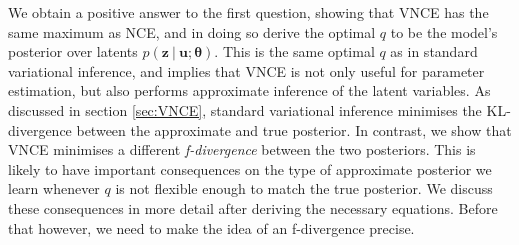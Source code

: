 \documentclass[11pt, oneside]{article}
\newcommand{\thetab}{{\boldsymbol{\theta}}}
\renewcommand{\u}{{\mathbf u}}
\newcommand{\z}{{\mathbf z}}
\newcommand\given[1][]{\:#1\vert\:}
\theoremstyle{definition}
\begin{document}
We obtain a positive answer to the first question, showing that VNCE has the same maximum as NCE, and in doing so derive the optimal $q$ to be the model's posterior over latents $p(\z \given \u ; \thetab)$. This is the same optimal $q$ as in standard variational inference, and implies that VNCE is not only useful for parameter estimation, but also performs approximate inference of the latent variables. As discussed in section \ref{sec:VNCE}, standard variational inference minimises the KL-divergence between the approximate and true posterior. In contrast, we show that VNCE minimises a different \emph{f-divergence} between the two posteriors. This is likely to have important consequences on the type of approximate posterior we learn whenever $q$ is not flexible enough to match the true posterior. We discuss these consequences in more detail after deriving the necessary equations. Before that however, we need to make the idea of an f-divergence precise.
\end{document}

